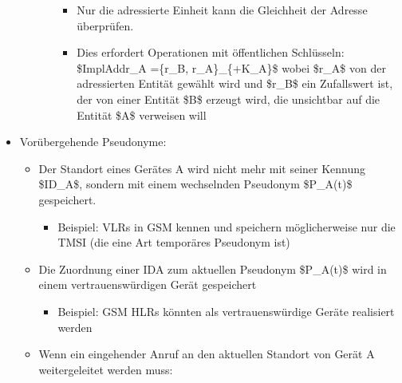 \documentclass[a4paper]{article}
\begin{document}
\begin{multicols}{3}
\begin{itemize}
\begin{itemize}
\begin{itemize}
                                  \begin{itemize}
                                      \item
                                            Nur die adressierte Einheit kann die Gleichheit der Adresse
                                            überprüfen.
                                      \item
                                            Dies erfordert Operationen mit öffentlichen Schlüsseln:
                                            \$ImplAddr\_A =\{r\_B, r\_A\}\_\{+K\_A\}\$ wobei \$r\_A\$ von
                                            der adressierten Entität gewählt wird und \$r\_B\$ ein
                                            Zufallswert ist, der von einer Entität \$B\$ erzeugt wird, die
                                            unsichtbar auf die Entität \$A\$ verweisen will
                                  \end{itemize}
                        \end{itemize}
              \end{itemize}
        \item
              Vorübergehende Pseudonyme:

              \begin{itemize}
                  \item
                        Der Standort eines Gerätes A wird nicht mehr mit seiner Kennung
                        \$ID\_A\$, sondern mit einem wechselnden Pseudonym \$P\_A(t)\$
                        gespeichert.

                        \begin{itemize}
                            \item
                                  Beispiel: VLRs in GSM kennen und speichern möglicherweise nur die
                                  TMSI (die eine Art temporäres Pseudonym ist)
                        \end{itemize}
                  \item
                        Die Zuordnung einer IDA zum aktuellen Pseudonym \$P\_A(t)\$ wird in
                        einem vertrauenswürdigen Gerät gespeichert

                        \begin{itemize}
                            \item
                                  Beispiel: GSM HLRs könnten als vertrauenswürdige Geräte realisiert
                                  werden
                        \end{itemize}
                  \item
                        Wenn ein eingehender Anruf an den aktuellen Standort von Gerät A
                        weitergeleitet werden muss:


\end{itemize}
\end{itemize}
\end{multicols}
\end{document}
